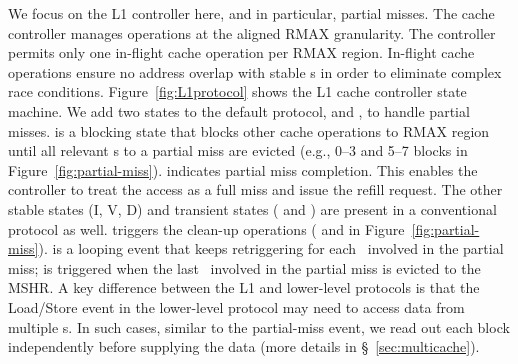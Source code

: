 We focus on the L1 controller here, and in particular, partial misses. The cache controller manages operations at
the aligned RMAX granularity. The controller  permits only one in-flight cache operation per RMAX region. In-flight cache operations ensure no address overlap with stable  \AB{}s in order to eliminate complex race conditions. Figure~\ref{fig:L1protocol} shows the L1 cache controller state machine. We add two states to the default protocol,  and , to handle partial misses.  is a blocking state that blocks other cache operations to RMAX region until all relevant \AB{}s to a partial miss are evicted (e.g., 0--3 and 5--7 blocks in Figure~\ref{fig:partial-miss}).  indicates partial miss completion. This enables the controller to treat the access as a full miss and issue the refill request. The other stable states (I, V, D) and transient states ( and ) are present in a conventional protocol as well.  triggers the clean-up operations ( and  in Figure~\ref{fig:partial-miss}).  is a looping event that keeps retriggering for each \AB\ involved in the partial miss;  is triggered when the last \AB\ involved in the partial miss is evicted to the MSHR. A key difference between the L1 and lower-level protocols is that the Load/Store event in the lower-level protocol may need to access data from multiple \AB{}s. In such cases, similar to the partial-miss event, we read out each block independently before
supplying the data (more details in \S~\ref{sec:multicache}).



